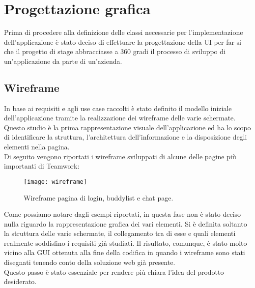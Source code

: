 \section{Progettazione grafica}
Prima di procedere alla definizione delle classi necessarie per l'implementazione 
dell'applicazione è stato deciso di effettuare la progettazione della UI per far 
si che il progetto di stage abbracciasse a 360 gradi il processo di sviluppo di 
un'applicazione da parte di un'azienda.

\subsection{Wireframe}
In base ai requisiti e agli use case raccolti è stato definito il modello iniziale
 dell'applicazione tramite la realizzazione dei wireframe delle varie schermate. \\
Questo studio è la prima rappresentazione visuale dell'applicazione ed ha lo 
scopo di identificare la struttura, l'architettura dell'informazione e la 
disposizione degli elementi nella pagina.\\
Di seguito vengono riportati i wireframe sviluppati di alcune delle pagine più 
importanti di Teamwork:
\begin{figure}[H] 
	\centering
	\texttt{[image: wireframe]}
	\caption{Wireframe pagina di login, buddylist e chat page.}
\end{figure}
Come possiamo notare dagli esempi riportati, in questa fase non è stato deciso 
nulla riguardo la rappresentazione grafica dei vari elementi. 
Si è definita soltanto la struttura delle varie schermate, il collegamento tra 
di esse e quali elementi realmente soddisfino i requisiti già studiati. 
Il risultato, comunque, è stato molto vicino alla GUI ottenuta alla fine della 
codifica in quando i wireframe sono stati disegnati tenendo conto della 
soluzione web già presente.\\ 
Questo passo è stato essenziale per rendere più chiara l'idea del prodotto desiderato.

